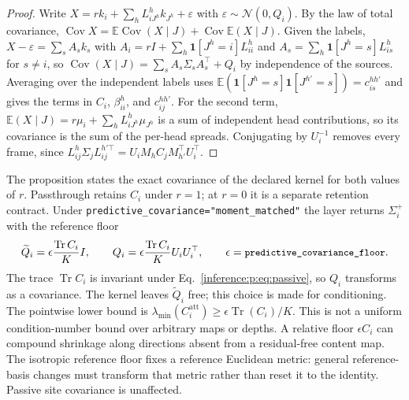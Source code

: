 \documentclass[11pt]{article}
\theoremstyle{definition}
\theoremstyle{remark}
\providecommand{\cfg}[1]{{\small\texttt{#1}}}
\providecommand{\Tr}{\operatorname{Tr}}
\providecommand{\E}{\mathbb{E}}
\providecommand{\N}{\mathcal{N}}
\providecommand{\Cov}{\operatorname{Cov}}
\begin{document}
\begin{proof}
Write $X=rk_i+\sum_hL_{iJ^h}^{h}k_{J^h}+\varepsilon$ with $\varepsilon\sim\N(0,Q_i)$. By the law of total covariance, $\Cov X=\E\Cov(X\mid J)+\Cov\E(X\mid J)$. Given the labels, $X-\varepsilon=\sum_sA_sk_s$ with $A_i=rI+\sum_h\mathbf 1[J^h=i]L_{ii}^{h}$ and $A_s=\sum_h\mathbf 1[J^h=s]L_{is}^{h}$ for $s\ne i$, so $\Cov(X\mid J)=\sum_sA_s\Sigma_sA_s^{\top}+Q_i$ by independence of the sources. Averaging over the independent labels uses $\E(\mathbf 1[J^h=s]\mathbf 1[J^{h'}=s])=c_{is}^{hh'}$ and gives the terms in $C_i$, $\beta_{ii}^{h}$, and $c_{ij}^{hh'}$. For the second term, $\E(X\mid J)=r\mu_i+\sum_hL_{iJ^h}^{h}\mu_{J^h}$ is a sum of independent head contributions, so its covariance is the sum of the per-head spreads. Conjugating by $U_i^{-1}$ removes every frame, since $L_{ij}^{h}\Sigma_jL_{ij}^{h'\top}=U_iM_hC_jM_{h'}^{\top}U_i^{\top}$.
\end{proof}

The proposition states the exact covariance of the declared kernel for both values of $r$. Passthrough retains $C_i$ under $r=1$; at $r=0$ it is a separate retention contract. Under \cfg{predictive\_covariance="moment\_matched"} the layer returns $\Sigma_i^{+}$ with the reference floor
\begin{equation}
\widetilde Q_i=\epsilon\frac{\Tr C_i}{K}I,\qquad Q_i=\epsilon\frac{\Tr C_i}{K}U_iU_i^{\top},\qquad \epsilon=\cfg{predictive\_covariance\_floor}.
\label{inference:p:eq:floor}
\end{equation}
The trace $\Tr C_i$ is invariant under Eq.~\eqref{inference:p:eq:passive}, so $Q_i$ transforms as a covariance. The kernel leaves $\widetilde Q_i$ free; this choice is made for conditioning. The pointwise lower bound is $\lambda_{\min}(C_i^{\mathrm{att}})\ge\epsilon\Tr(C_i)/K$. This is not a uniform condition-number bound over arbitrary maps or depths. A relative floor $\epsilon C_i$ can compound shrinkage along directions absent from a residual-free content map. The isotropic reference floor fixes a reference Euclidean metric: general reference-basis changes must transform that metric rather than reset it to the identity. Passive site covariance is unaffected.
\end{document}
